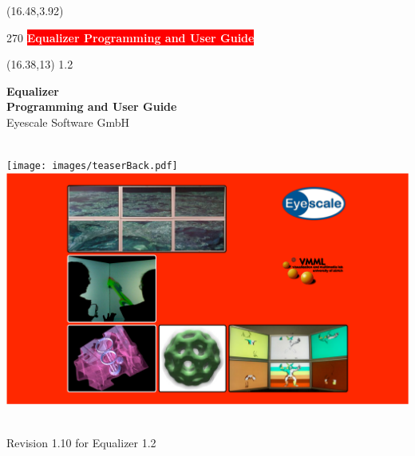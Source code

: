 \documentclass[10pt]{scrartcl}
\newcommand{\boxwidth}{5in}
\newcommand{\spacewidth}{621pt}
\newcommand{\spinewidth}{19.264pt}
\begin{document}
\thispagestyle{empty}

\begin{textblock}{}(16.48,3.92)
  \begin{rotate}{270}
    \setlength{\fboxsep}{9.4pt} 
    \colorbox{red}{\textsf{\bfseries\LARGE\textcolor{white}{{\hspace{12pt}Equalizer
            Programming and User Guide\hspace{12pt}}}}}
  \end{rotate}
\end{textblock}

\begin{textblock}{}(16.38,13)
  {\Large 1.2}
\end{textblock}

\parbox[t]{\spacewidth}{\hfill}
\parbox[t]{\boxwidth}{
\vspace{-32pt}
  \center
  \textsf{\textbf{\huge Equalizer\\Programming and User Guide}}\\[\bigskipamount]
  {\Large Eyescale Software GmbH}\\
}\\
\vfill
\vspace{32pt}
\hspace{-128pt}
  \texttt{[image: images/teaserBack.pdf]}
  \hspace{\spinewidth}
  \includegraphics[width=\spacewidth]{images/teaser.pdf}
\\
\vfill
\parbox[t]{\spacewidth}{\hfill}
\parbox[t]{\boxwidth}{ \\\vspace{1cm}
  {\Large Revision 1.10 for Equalizer 1.2}\\[\medskipamount]
}
\end{document}
